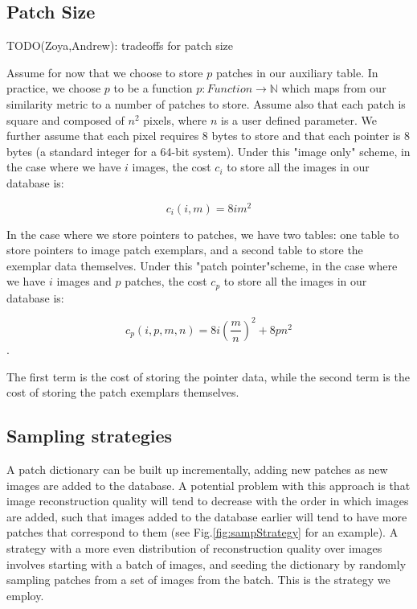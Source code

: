 
\subsection{Patch Size}

TODO(Zoya,Andrew): tradeoffs for patch size

Assume for now that we choose to store $p$ patches in our auxiliary table.  In practice, we choose $p$ to be a function $p \colon Function \to \mathds{N}$ which maps from our similarity metric to a number of patches to store.  Assume also that each patch is square and composed of $n^2$ pixels, where $n$ is a user defined parameter.  We further assume that each pixel requires 8 bytes to store  and that each pointer is 8 bytes (a standard integer for a 64-bit system).  Under this "image only" scheme, in the case where we have $i$ images, the cost $c_i$ to store all the images in our database is:

\begin{equation}
	c_i(i, m) = 8  i  m^2
\end{equation}

In the case where we store pointers to patches, we have two tables: one table to store pointers to image patch exemplars, and a second table to store the exemplar data themselves.  Under this "patch pointer"scheme, in the case where we have $i$ images and $p$ patches, the cost $c_p$ to store all the images in our database is:

\begin{equation}
	c_p(i, p, m, n) = 8 i (\frac{m}{n})^2 + 8  p  n^2
\end{equation}.

The first term is the cost of storing the pointer data, while the second term is the cost of storing the patch exemplars themselves.


\subsection{Sampling strategies}

A patch dictionary can be built up incrementally, adding new patches as new images are added to the database. A potential problem with this approach is that image reconstruction quality will tend to decrease with the order in which images are added, such that images added to the database earlier will tend to have more patches that correspond to them (see Fig.\ref{fig:sampStrategy} for an example). A strategy with a more even distribution of reconstruction quality over images involves starting with a batch of images, and seeding the dictionary by randomly sampling patches from a set of images from the batch. This is the strategy we employ. 

